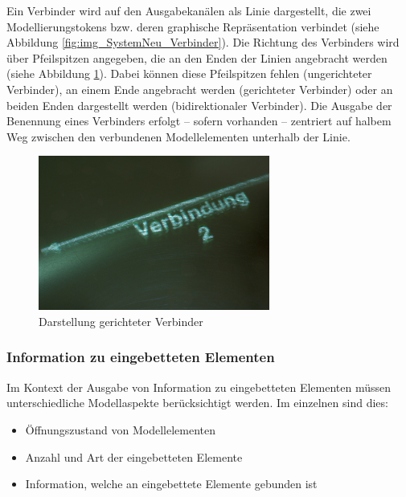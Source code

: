 Ein Verbinder wird auf den Ausgabekanälen als Linie dargestellt, die zwei Modellierungstokens bzw. deren graphische Repräsentation verbindet (siehe Abbildung \ref{fig:img_SystemNeu_Verbinder}). Die Richtung des Verbinders wird über Pfeilspitzen angegeben, die an den Enden der Linien angebracht werden (siehe Abbildung \ref{fig:img_SystemNeu_VerbindungGerichtetTisch}). Dabei können diese Pfeilspitzen fehlen (ungerichteter Verbinder), an einem Ende angebracht werden (gerichteter Verbinder) oder an beiden Enden dargestellt werden (bidirektionaler Verbinder). Die Ausgabe der Benennung eines Verbinders erfolgt -- sofern vorhanden -- zentriert auf halbem Weg zwischen den verbundenen Modellelementen unterhalb der Linie. 

\begin{figure}[htbp]
	\centering
		\includegraphics[height=2in]{img/SystemNeu/VerbindungGerichtetTisch.jpg}
	\caption{Darstellung gerichteter Verbinder}
	\label{fig:img_SystemNeu_VerbindungGerichtetTisch}
\end{figure}


\subsubsection{Information zu eingebetteten Elementen} %
\label{ssub:information_zu_eingebetteten_elementen}

Im Kontext der Ausgabe von Information zu eingebetteten Elementen müssen unterschiedliche Modellaspekte berücksichtigt werden. Im einzelnen sind dies:
\begin{itemize}
 \item Öffnungszustand von Modellelementen
 \item Anzahl und Art der eingebetteten Elemente
 \item Information, welche an eingebettete Elemente gebunden ist
\end{itemize}

